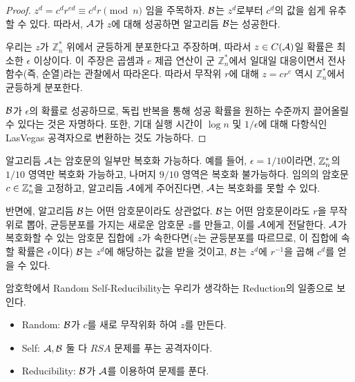 \begin{proof}
    $z^d = c^d r^{ed} \equiv c^d r \pmod n$ 임을 주목하자. $\mathcal{B}$는 $z^d$로부터
    $c^d$의 값을 쉽게 유추할 수 있다. 따라서, $\mathcal{A}$가 $z$에 대해 성공하면 알고리듬
    $\mathcal{B}$는 성공한다.

    우리는 $z$가 $\mathbb{Z}_n^*$ 위에서 균등하게 분포한다고 주장하며, 따라서 $z
    \in C(\mathcal{A})$일 확률은 최소한 $\epsilon$ 이상이다. 이 주장은 곱셈과 $e$ 제곱
    연산이 군 $\mathbb{Z}_n^*$에서 일대일 대응이면서 전사 함수(즉, 순열)라는
    관찰에서 따라온다. 따라서 무작위 $r$에 대해 $z = cr^e$ 역시
    $\mathbb{Z}_n^*$에서 균등하게 분포한다.

    $\mathcal{B}$가 $\epsilon$의 확률로 성공하므로, 독립 반복을 통해 성공 확률을 원하는
    수준까지 끌어올릴 수 있다는 것은 자명하다. 또한, 기대 실행 시간이 $\log n$
    및 $1/\epsilon$에 대해 다항식인 LasVegas 공격자으로 변환하는 것도 가능하다.
\end{proof}

\begin{memo}
    알고리듬 $\mathcal{A}$는 암호문의 일부만 복호화 가능하다. 예를 들어, $\epsilon =
    1/10$이라면, $\mathbb{Z}^*_n$의 $1/10$ 영역만 복호화 가능하고, 나머지 $9/10$ 영역은
    복호화 불가능하다. 임의의 암호문 $c \in \mathbb{Z}^*_n$을 고정하고, 알고리듬
    $\mathcal{A}$에게 주어진다면, $\mathcal{A}$는 복호화를 못할 수 있다.

    반면에, 알고리듬 $\mathcal{B}$는 어떤 암호문이라도 상관없다. $\mathcal{B}$는 어떤 암호문이라도
    $r$을 무작위로 뽑아, 균등분포를 가지는 새로운 암호문 $z$를 만들고, 이를
    $\mathcal{A}$에게 전달한다. $\mathcal{A}$가 복호화할 수 있는 암호문 집합에 $z$가
    속한다면($z$는 균등분포를 따르므로, 이 집합에 속할 확률은 $\epsilon$이다) $\mathcal{B}$는 $z^d$에 해당하는 값을 받을
    것이고, $\mathcal{B}$는 $z^d$에 $r^{-1}$을 곱해 $c^d$를 얻을 수 있다.
\end{memo}

\begin{memo}
    암호학에서 Random Self-Reducibility는 우리가 생각하는 Reduction의 일종으로
    보인다.
    \begin{itemize}
        \item Random: $\mathcal{B}$가 $c$를 새로 무작위화 하여 $z$를 만든다.
        \item Self: $\mathcal{A}, \mathcal{B}$ 둘 다 $RSA$ 문제를 푸는 공격자이다.
        \item Reducibility: $\mathcal{B}$가 $\mathcal{A}$를 이용하여 문제를 푼다.
    \end{itemize}
\end{memo}

